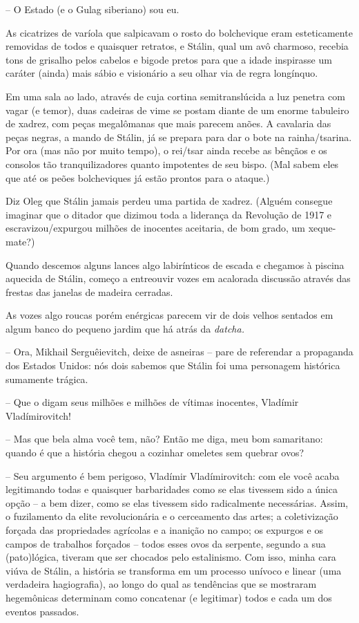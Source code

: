 -- O Estado (e o Gulag siberiano) sou eu.

As cicatrizes de varíola que salpicavam o rosto do bolchevique eram
esteticamente removidas de todos e quaisquer retratos, e Stálin, qual um
avô charmoso, recebia tons de grisalho pelos cabelos e bigode pretos
para que a idade inspirasse um caráter (ainda) mais sábio e visionário a
seu olhar via de regra longínquo.

Em uma sala ao lado, através de cuja cortina semitranslúcida a luz
penetra com vagar (e temor), duas cadeiras de vime se postam diante de
um enorme tabuleiro de xadrez, com peças megalômanas que mais parecem
anões. A cavalaria das peças negras, a mando de Stálin, já se prepara
para dar o bote na rainha/tsarina. Por ora (mas não por muito tempo), o
rei/tsar ainda recebe as bênçãos e os consolos tão tranquilizadores
quanto impotentes de seu bispo. (Mal sabem eles que até os peões
bolcheviques já estão prontos para o ataque.)

Diz Oleg que Stálin jamais perdeu uma partida de xadrez. (Alguém
consegue imaginar que o ditador que dizimou toda a liderança da
Revolução de 1917 e escravizou/expurgou milhões de inocentes aceitaria,
de bom grado, um xeque-mate?)

Quando descemos alguns lances algo labirínticos de escada e chegamos à
piscina aquecida de Stálin, começo a entreouvir vozes em acalorada
discussão através das frestas das janelas de madeira cerradas.

As vozes algo roucas porém enérgicas parecem vir de dois velhos sentados
em algum banco do pequeno jardim que há atrás da \emph{datcha. }

-- Ora, Mikhail Serguêievitch, deixe de asneiras -- pare de referendar a
propaganda dos Estados Unidos: nós dois sabemos que Stálin foi uma
personagem histórica sumamente trágica.

-- Que o digam seus milhões e milhões de vítimas inocentes, Vladímir
Vladímirovitch!

-- Mas que bela alma você tem, não? Então me diga, meu bom samaritano:
quando é que a história chegou a cozinhar omeletes sem quebrar ovos?

-- Seu argumento é bem perigoso, Vladímir Vladímirovitch: com ele você
acaba legitimando todas e quaisquer barbaridades como se elas tivessem
sido a única opção -- a bem dizer, como se elas tivessem sido
radicalmente necessárias. Assim, o fuzilamento da elite revolucionária e
o cerceamento das artes; a coletivização forçada das propriedades
agrícolas e a inanição no campo; os expurgos e os campos de trabalhos
forçados -- todos esses ovos da serpente, segundo a sua (pato)lógica,
tiveram que ser chocados pelo estalinismo. Com isso, minha cara viúva de
Stálin, a história se transforma em um processo unívoco e linear (uma
verdadeira hagiografia), ao longo do qual as tendências que se mostraram
hegemônicas determinam como concatenar (e legitimar) todos e cada um dos
eventos passados.

